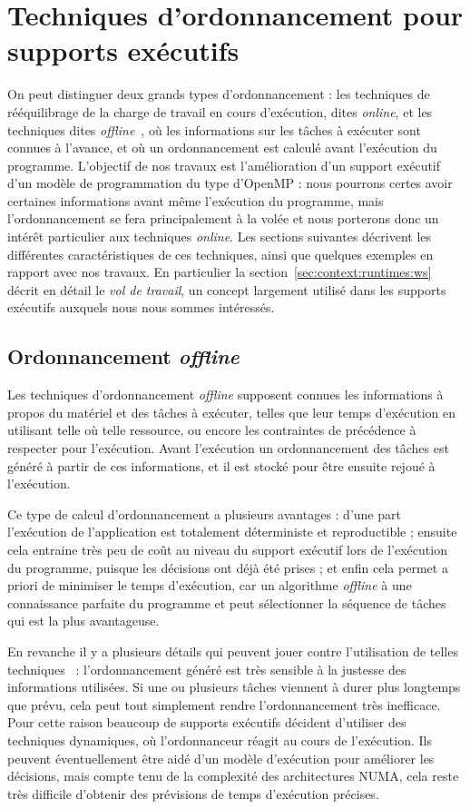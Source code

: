 \section{Techniques d'ordonnancement pour supports exécutifs}\label{sec:context:runtimes}

On peut distinguer deux grands types d'ordonnancement : les techniques de rééquilibrage de la charge de travail en cours d'exécution, dites \emph{online}, et les techniques dites \emph{offline}~\cite{Karp1992}, où les informations sur les tâches à exécuter sont connues à l'avance, et où un ordonnancement est calculé avant l'exécution du programme.
L'objectif de nos travaux est l'amélioration d'un support exécutif d'un modèle de programmation du type d'OpenMP : nous pourrons certes avoir certaines informations avant même l'exécution du programme, mais l'ordonnancement se fera principalement à la volée et nous porterons donc un intérêt particulier aux techniques \emph{online}.
Les sections suivantes décrivent les différentes caractéristiques de ces techniques, ainsi que quelques exemples en rapport avec nos travaux.
En particulier la section~\ref{sec:context:runtimes:ws} décrit en détail le \emph{vol de travail}, un concept largement utilisé dans les supports exécutifs auxquels nous nous sommes intéressés.

\subsection{Ordonnancement \emph{offline}}

Les techniques d'ordonnancement \emph{offline} supposent connues les informations à propos du matériel et des tâches à exécuter, telles que leur temps d'exécution en utilisant telle où telle ressource, ou encore les contraintes de précédence à respecter pour l'exécution.
Avant l'exécution un ordonnancement des tâches est généré à partir de ces informations, et il est stocké pour être ensuite rejoué à l'exécution.

Ce type de calcul d'ordonnancement a plusieurs avantages : d'une part l'exécution de l'application est totalement déterministe et reproductible ; ensuite cela entraine très peu de coût au niveau du support exécutif lors de l'exécution du programme, puisque les décisions ont déjà été prises ; et enfin cela permet a priori de minimiser le temps d'exécution, car un algorithme \emph{offline} à une connaissance parfaite du programme et peut sélectionner la séquence de tâches qui est la plus avantageuse.

En revanche il y a plusieurs détails qui peuvent jouer contre l'utilisation de telles techniques~\cite{Locke1992} : l'ordonnancement généré est très sensible à la justesse des informations utilisées. Si une ou plusieurs tâches viennent à durer plus longtemps que prévu, cela peut tout simplement rendre l'ordonnancement très inefficace.
Pour cette raison beaucoup de supports exécutifs décident d'utiliser des techniques dynamiques, où l'ordonnanceur réagit au cours de l'exécution.
Ils peuvent éventuellement être aidé d'un modèle d'exécution pour améliorer les décisions, mais compte tenu de la complexité des architectures NUMA, cela reste très difficile d'obtenir des prévisions de temps d'exécution précises.

